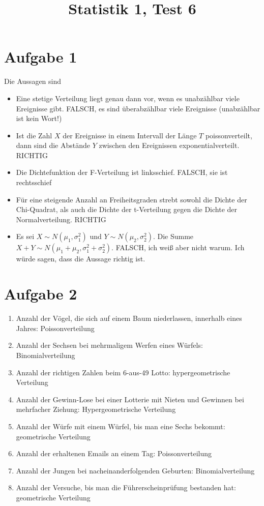 \documentclass{article}
\title{\textbf{Statistik 1, Test 6}}
\date{}
\begin{document}
	\maketitle
	
	\section*{Aufgabe 1}
	Die Aussagen sind
	\begin{itemize}
		\item Eine stetige Verteilung liegt genau dann vor, wenn es unabzählbar viele Ereignisse gibt. FALSCH, es sind überabzählbar viele Ereignisse (unabzählbar ist kein Wort!)
		\item Ist die Zahl $X$ der Ereignisse in einem Intervall der Länge $T$ poissonverteilt, dann sind die Abstände $Y$ zwischen den Ereignissen exponentialverteilt. RICHTIG
		\item Die Dichtefunktion der F-Verteilung ist linksschief. FALSCH, sie ist rechtsschief
		\item Für eine steigende Anzahl an Freiheitsgraden strebt sowohl die Dichte der Chi-Quadrat, als auch die Dichte der t-Verteilung gegen die Dichte der Normalverteilung. RICHTIG
		\item Es sei $X\sim N(\mu_1,\sigma_1^2)$ und $Y\sim N(\mu_2,\sigma_2^2)$. Die Summe  $X+Y\sim N(\mu_1+\mu_2,\sigma_1^2+\sigma_2^2)$. FALSCH, ich weiß aber nicht warum. Ich würde sagen, dass die Aussage richtig ist.
	\end{itemize}

	\section*{Aufgabe 2}
	\begin{enumerate}[label=(\alph*)]
		\item Anzahl der Vögel, die sich auf einem Baum niederlassen, innerhalb eines Jahres: Poissonverteilung
		\item Anzahl der Sechsen bei mehrmaligem Werfen eines Würfels: Binomialverteilung
		\item Anzahl der richtigen Zahlen beim 6-aus-49 Lotto: hypergeometrische Verteilung
		\item Anzahl der Gewinn-Lose bei einer Lotterie mit Nieten und Gewinnen bei mehrfacher Ziehung: Hypergeometrische Verteilung
		\item Anzahl der Würfe mit einem Würfel, bis man eine Sechs bekommt: geometrische Verteilung
		\item Anzahl der erhaltenen Emails an einem Tag: Poissonverteilung
		\item Anzahl der Jungen bei nacheinanderfolgenden Geburten: Binomialverteilung
		\item Anzahl der Versuche, bis man die Führerscheinprüfung bestanden hat: geometrische Verteilung
	\end{enumerate}
\end{document}
